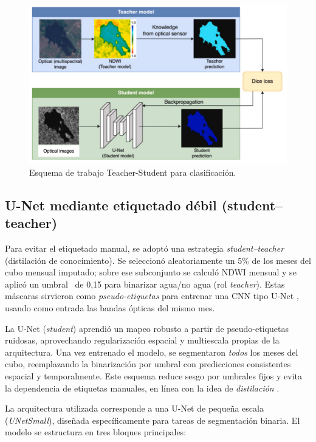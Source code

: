 \begin{figure}[ht]
        \centering
        \includegraphics[scale=.20]
        {Figures/deep_2.png}
        \caption{Esquema de trabajo Teacher-Student para clasificación.}
        \label{fig:img_mens}
\end{figure}

\subsection{U-Net mediante etiquetado débil (student--teacher)}
Para evitar el etiquetado manual, se adoptó una estrategia \emph{student--teacher} (distilación de conocimiento). Se seleccionó aleatoriamente un 5\% de los meses del cubo mensual imputado; sobre ese subconjunto se calculó NDWI mensual y se aplicó un umbral \ de 0{,}15 para binarizar agua/no agua (rol \emph{teacher}). Estas máscaras sirvieron como \emph{pseudo-etiquetas} para entrenar una CNN tipo U-Net \parencite{ronneberger2015unet}, usando como entrada las bandas ópticas del mismo mes.

La U-Net (\emph{student}) aprendió un mapeo robusto a partir de pseudo-etiquetas ruidosas, aprovechando regularización espacial y multiescala propias de la arquitectura. Una vez entrenado el modelo, se segmentaron \emph{todos} los meses del cubo, reemplazando la binarización por umbral con predicciones consistentes espacial y temporalmente. Este esquema reduce sesgo por umbrales fijos y evita la dependencia de etiquetas manuales, en línea con la idea de \emph{distilación} \parencite{hinton2015distilling}. 

La arquitectura utilizada corresponde a una U-Net de pequeña escala (\textit{UNetSmall}), diseñada específicamente para tareas de segmentación binaria. El modelo se estructura en tres bloques principales:

